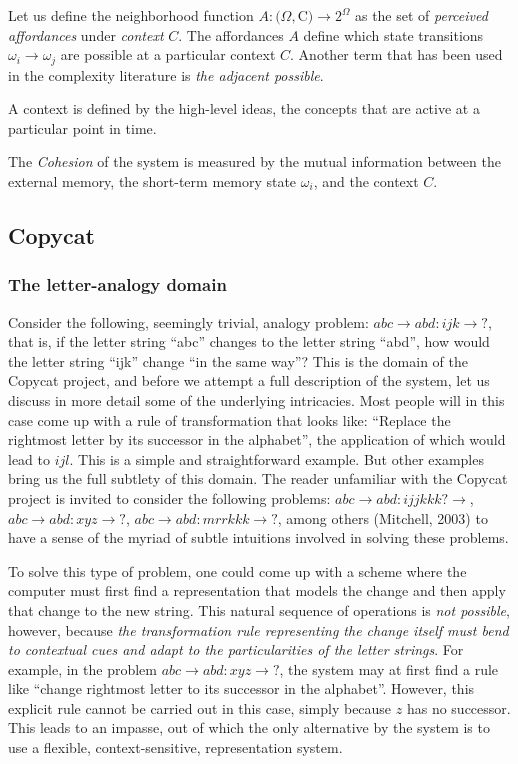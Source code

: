 \documentclass[a4paper]{article}
\begin{document}
Let us define the neighborhood function $A:(\Omega,$C$) \to 2^\Omega$ as the set of \emph{perceived affordances} under \emph{context} $C$.  The affordances $A$ define which state transitions $\omega_i \to \omega_j$ are possible at a particular context $C$. Another term that has been used in the complexity literature is \emph{the adjacent possible}. 

A context is defined by the high-level ideas, the concepts that are active at a particular point in time. 

The \emph{Cohesion} of the system is measured by the mutual information between the external memory, the short-term memory state $\omega_i$, and the context $C$.  

\subsection{Copycat}


\subsubsection{The letter-analogy domain}

Consider the following, seemingly trivial, analogy problem: $abc \to abd:ijk \to ?$, that is, if the letter string “abc” changes to the letter string “abd”, how would the letter string “ijk” change “in the same way”?  This is the domain of the Copycat project, and before we attempt a full description of the system, let us discuss in more detail some of the underlying intricacies.   Most people will in this case come up with a rule of transformation that looks like: “Replace the rightmost letter by its successor in the alphabet”, the application of which would lead to $ijl$.  This is a simple and straightforward example.  But other examples bring us the full subtlety of this domain.  The reader unfamiliar with the Copycat project is invited to consider the following problems: $abc\to abd: ijjkkk?\to $, $abc\to abd: xyz\to ?$, $abc\to abd: mrrkkk\to ?$, among others (Mitchell, 2003) to have a sense of the myriad of subtle intuitions involved in solving these problems.

To solve this type of problem, one could come up with a scheme where the computer must first find a representation that models the change and then apply that change to the new string.  This natural sequence of operations is \emph{not possible}, however, because \emph{the transformation rule representing the change itself must bend to contextual cues and adapt to the particularities of the letter strings}.  For example, in the problem $abc\to abd: xyz\to ?$, the system may at first find a rule like “change rightmost letter to its successor in the alphabet”.  However, this explicit rule cannot be carried out in this case, simply because $z$ has no successor.  This leads to an impasse, out of which the only alternative by the system is to use a flexible, context-sensitive, representation system. 
\end{document}
